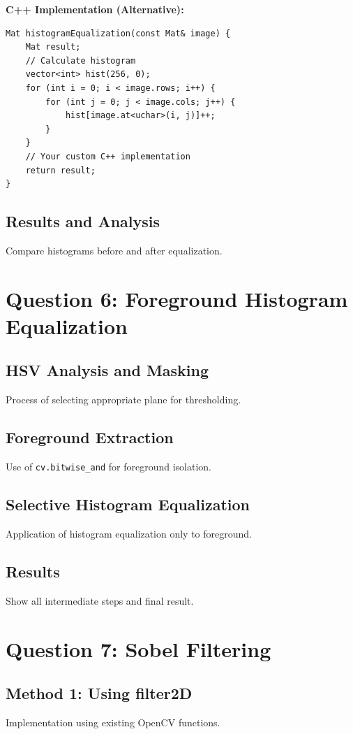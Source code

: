 \documentclass[11pt]{article}
\begin{document}
\textbf{C++ Implementation (Alternative):}
\begin{lstlisting}[style=cppstyle]
Mat histogramEqualization(const Mat& image) {
    Mat result;
    // Calculate histogram
    vector<int> hist(256, 0);
    for (int i = 0; i < image.rows; i++) {
        for (int j = 0; j < image.cols; j++) {
            hist[image.at<uchar>(i, j)]++;
        }
    }
    // Your custom C++ implementation
    return result;
}
\end{lstlisting}

\subsection{Results and Analysis}
Compare histograms before and after equalization.

\section{Question 6: Foreground Histogram Equalization}
\subsection{HSV Analysis and Masking}
Process of selecting appropriate plane for thresholding.

\subsection{Foreground Extraction}
Use of \texttt{cv.bitwise\_and} for foreground isolation.

\subsection{Selective Histogram Equalization}
Application of histogram equalization only to foreground.

\subsection{Results}
Show all intermediate steps and final result.

\section{Question 7: Sobel Filtering}
\subsection{Method 1: Using filter2D}
Implementation using existing OpenCV functions.
\end{document}
